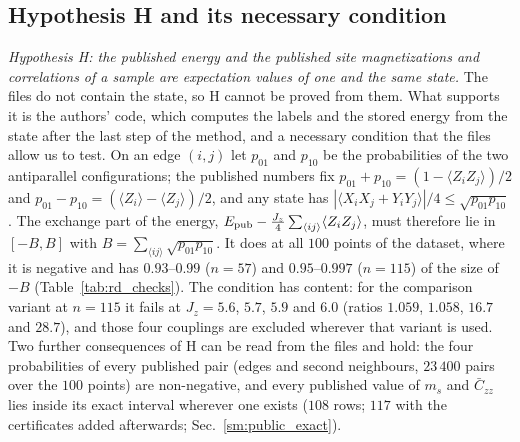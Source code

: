 \documentclass[aps,prx,onecolumn,10pt,nofootinbib,longbibliography,floatfix]{revtex4-2}
\theoremstyle{remark}
\newcommand{\Jz}{J_z}
\newcommand{\ms}{m_s}
\newcommand{\Czz}{\bar C_{zz}}
\begin{document}
\subsection{Hypothesis H and its necessary condition}
\emph{Hypothesis H: the published energy and the published site magnetizations and correlations of a sample are
expectation values of one and the same state.} The files do not contain the state, so H cannot be proved from them.
What supports it is the authors' code, which computes the labels and the stored energy from the state after the last
step of the method, and a necessary condition that the files allow us to test. On an edge $(i,j)$ let $p_{01}$ and
$p_{10}$ be the probabilities of the two antiparallel configurations; the published numbers fix
$p_{01}+p_{10}=(1-\langle Z_iZ_j\rangle)/2$ and $p_{01}-p_{10}=(\langle Z_i\rangle-\langle Z_j\rangle)/2$, and any
state has $|\langle X_iX_j+Y_iY_j\rangle|/4\le\sqrt{p_{01}p_{10}}$. The exchange part of the energy,
$E_{\rm pub}-\frac{\Jz}{4}\sum_{\langle ij\rangle}\langle Z_iZ_j\rangle$, must therefore lie in $[-B,B]$ with
$B=\sum_{\langle ij\rangle}\sqrt{p_{01}p_{10}}$. It does at all $100$ points of the dataset, where it is negative and %
has $0.93$--$0.99$ ($n=57$) and $0.95$--$0.997$ ($n=115$) of the size of $-B$ (Table~\ref{tab:rd_checks}). The %
condition has content: for the comparison variant at $n=115$ it fails at $\Jz=5.6$, $5.7$, $5.9$ and $6.0$ (ratios %
$1.059$, $1.058$, $16.7$ and $28.7$), and those four couplings are excluded wherever that variant is used. %
Two further consequences of H can be read from the files and hold: the four probabilities of every published pair
(edges and second neighbours, $23\,400$ pairs over the $100$ points) are non-negative, and every published value %
of $\ms$ and $\Czz$ lies inside its exact interval wherever one exists ($108$ rows; $117$ with the certificates %
added afterwards; Sec.~\ref{sm:public_exact}).
\end{document}
